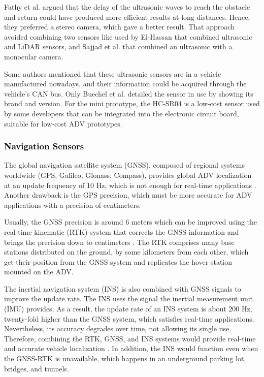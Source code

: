 \documentclass[lettersize,journal]{IEEEtran}
\begin{document}
 Fathy et al. \cite{Fathy2020} argued that the delay of the ultrasonic waves to reach the obstacle and return could have produced more efficient results at long distances. Hence, they preferred a stereo camera, which gave a better result. That approach avoided combining two sensors like used by El-Hassan \cite{el2020} that combined ultrasonic and LiDAR sensors, and Sajjad et al. \cite{Sajjad2020} that combined an ultrasonic with a monocular camera.
 
 Some authors mentioned that these ultrasonic sensors are in a vehicle manufactured nowadays, and their information could be acquired through the vehicle's CAN bus. Only Buechel et al. \cite{Buechel2015}  detailed the sensor in use by showing its brand and version. For the mini prototype, the HC-SR04 is a low-cost sensor used by some developers \cite{azid2017,Valocky2019,roestam2019,Sajjad2020} that can be integrated into the electronic circuit board, suitable for low-cost ADV prototypes.

\vspace{\baselineskip}

\subsubsection {\textcolor{black}{\textbf{Navigation Sensors}}}

\leavevmode\vspace{0.1\baselineskip}%

The global navigation satellite system (GNSS), composed of regional systems worldwide (GPS, Galileo, Glonass, Compass), provides global ADV localization at an update frequency of 10 Hz, which is not enough for real-time applications \cite{Liu2019}. Another drawback is the GPS precision, which must be more accurate for ADV applications with a precision of centimeters.

Usually, the GNSS precision is around 6 meters which can be improved using the real-time kinematic (RTK) system that corrects the GNSS information and brings the precision down to centimeters \cite{Buyval2019}. The RTK comprises many base stations distributed on the ground, by some kilometers from each other, which get their position from the GNSS system and replicates the hover station mounted on the ADV.

The inertial navigation system (INS) is also combined with GNSS signals to improve the update rate. The INS uses the signal the inertial measurement unit (IMU) provides. As a result, the update rate of an INS system is about 200 Hz, twenty-fold higher than the GNSS system, which satisfies real-time applications. Nevertheless, its accuracy degrades over time, not allowing its single use. Therefore, combining the RTK, GNSS, and INS systems would provide real-time and accurate vehicle localization \cite{Liu2019}. In addition, the INS would function even when the GNSS-RTK is unavailable, which happens in an underground parking lot, bridges, and tunnels.
\end{document}

